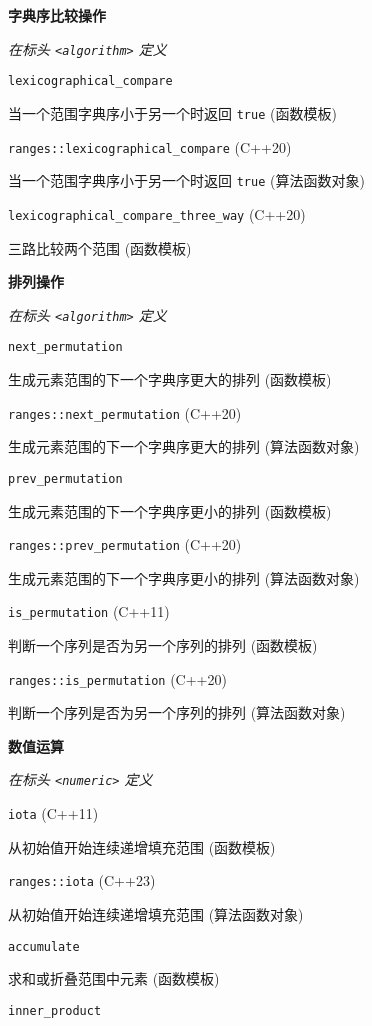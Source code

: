 \noindent \textbf{字典序比较操作}

\textit{在标头 \lstinline{<algorithm>} 定义}


\noindent \lstinline{lexicographical_compare}

当⼀个范围字典序⼩于另⼀个时返回 \lstinline{true} (函数模板)

\noindent \lstinline{ranges::lexicographical_compare} (C++20)

当⼀个范围字典序⼩于另⼀个时返回 \lstinline{true} (算法函数对象)

\noindent \lstinline{lexicographical_compare_three_way} (C++20)

三路⽐较两个范围 (函数模板)

\noindent \textbf{排列操作}

\textit{在标头 \lstinline{<algorithm>} 定义}


\noindent \lstinline{next_permutation}

⽣成元素范围的下⼀个字典序更⼤的排列 (函数模板)

\noindent \lstinline{ranges::next_permutation} (C++20)

⽣成元素范围的下⼀个字典序更⼤的排列 (算法函数对象)

\noindent \lstinline{prev_permutation}

⽣成元素范围的下⼀个字典序更⼩的排列 (函数模板)

\noindent \lstinline{ranges::prev_permutation} (C++20)

⽣成元素范围的下⼀个字典序更⼩的排列 (算法函数对象)

\noindent \lstinline{is_permutation} (C++11)

判断⼀个序列是否为另⼀个序列的排列 (函数模板)

\noindent \lstinline{ranges::is_permutation} (C++20)

判断⼀个序列是否为另⼀个序列的排列 (算法函数对象)

\textbf{数值运算}

\textit{在标头 \lstinline{<numeric>} 定义}


\noindent \lstinline{iota} (C++11)

从初始值开始连续递增填充范围 (函数模板)

\noindent \lstinline{ranges::iota} (C++23)

从初始值开始连续递增填充范围 (算法函数对象)

\noindent \lstinline{accumulate}

求和或折叠范围中元素 (函数模板)

\noindent \lstinline{inner_product}

